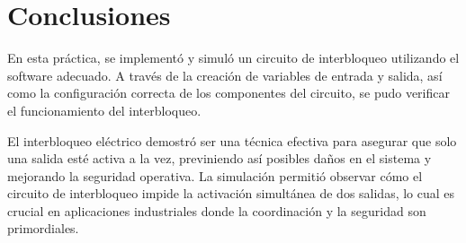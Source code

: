 \documentclass[12pt]{report}
\begin{document}
\newpage

\chapter{Conclusiones}
En esta práctica, se implementó y simuló un circuito de interbloqueo utilizando el software adecuado. A través de la creación de variables de entrada y salida, así como la configuración correcta de los componentes del circuito, se pudo verificar el funcionamiento del interbloqueo.

El interbloqueo eléctrico demostró ser una técnica efectiva para asegurar que solo una salida esté activa a la vez, previniendo así posibles daños en el sistema y mejorando la seguridad operativa. La simulación permitió observar cómo el circuito de interbloqueo impide la activación simultánea de dos salidas, lo cual es crucial en aplicaciones industriales donde la coordinación y la seguridad son primordiales.

\newpage
\end{document}
